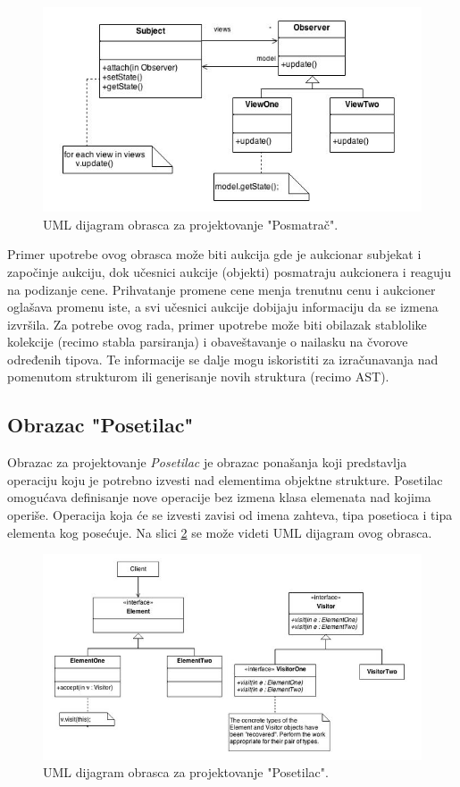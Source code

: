 \begin{figure}[h!]
\centering
\includegraphics[scale=0.8]{images/observer.jpg}
\caption{UML dijagram obrasca za projektovanje "Posmatrač".} 
\label{fig:UMLObserver}
\end{figure}

Primer upotrebe ovog obrasca može biti aukcija gde je aukcionar subjekat i započinje aukciju, dok učesnici aukcije (objekti) posmatraju aukcionera i reaguju na podizanje cene. Prihvatanje promene cene menja trenutnu cenu i aukcioner oglašava promenu iste, a svi učesnici aukcije dobijaju informaciju da se izmena izvršila. Za potrebe ovog rada, primer upotrebe može biti obilazak stablolike kolekcije (recimo stabla parsiranja) i obaveštavanje o nailasku na čvorove određenih tipova. Te informacije se dalje mogu iskoristiti za izračunavanja nad pomenutom strukturom ili generisanje novih struktura (recimo AST). 

\subsection{Obrazac "Posetilac"}
\label{subsec:DesignPatternsListener}

Obrazac za projektovanje \emph{Posetilac} je obrazac ponašanja koji predstavlja operaciju koju je potrebno izvesti nad elementima objektne strukture. Posetilac omogućava definisanje nove operacije bez izmena klasa elemenata nad kojima operiše. Operacija koja će se izvesti zavisi od imena zahteva, tipa posetioca i tipa elementa kog posećuje. Na slici \ref{fig:UMLVisitor} se može videti UML dijagram \cite{UML} ovog obrasca. 

\begin{figure}[h!]
    \centering
    \includegraphics[scale=0.8]{images/visitor.jpg}
    \caption{UML dijagram obrasca za projektovanje "Posetilac".} 
    \label{fig:UMLVisitor}
\end{figure}

